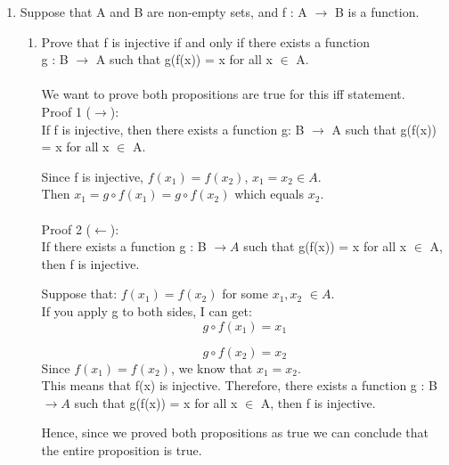 \documentclass[12pt]{article}
\begin{document}
\begin{enumerate}
    
    \item Suppose that A and B are non-empty sets, and f : A $\rightarrow$ B is a function.
    
        \begin{enumerate}[label=(\Alph*)]
            \item Prove that f is injective if and only if there exists a function \\g : B $\rightarrow$ A such that g(f(x)) = x for all x $\in$ A. \\
            \\        
            We want to prove both propositions are true for this iff statement. \\
            Proof 1 ($\rightarrow$): \\If f is injective, then there exists a function g: B $\rightarrow$ A such that g(f(x)) = x for all x $\in$ A. 

            Since f is injective, $f(x_1) = f(x_2)$, $x_1 = x_2 \in A$. \\
            Then $x_1 = g \circ f(x_1) = g \circ f(x_2)$ which equals $x_2$. 
            \\
            \\
            Proof 2 ($\leftarrow$): \\If there exists a function g : B $\rightarrow A$ such that g(f(x)) = x for all x $\in$ A, then f is injective.

            Suppose that: $f(x_1) = f(x_2)$ for some $x_1, x_2$ $\in A$. \\
            If you apply g to both sides, I can get:\\
            \begin{equation}
                g \circ f(x_1) = x_1 
            \end{equation}
            
            \begin{equation}
                g \circ f(x_2) = x_2
            \end{equation}
            Since $f(x_1) = f(x_2)$, we know that $x_1 = x_2$. \\ This means that f(x) is injective. 
            Therefore, there exists a function g : B $\rightarrow A$ such that g(f(x)) = x for all x $\in$ A, then f is injective. 
            
            Hence, since we proved both propositions as true we can conclude that the entire proposition is true. \qedsymbol{}
                        

\end{enumerate}
\end{enumerate}
\end{document}
